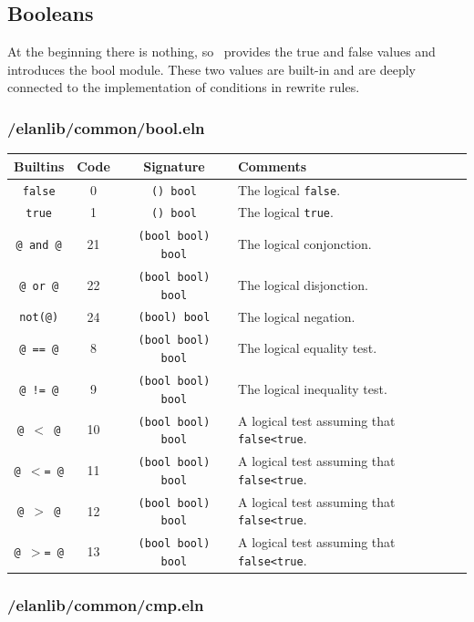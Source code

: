 \subsection{Booleans}

At the beginning there is nothing, so \elan\ provides the true and
false values and introduces the bool module. These two values are
built-in and are deeply connected to the implementation of conditions
in rewrite rules. 

\subsubsection{/elanlib/common/bool.eln}


\begin{tabular}{|c|c|c|p{8cm}|}
\hline
{\bf Builtins} & {\bf Code} & {\bf Signature} & {\bf Comments} \\
\hline
\hline
{\tt false}     & 0 & {\tt () bool} & The logical {\tt false}.\\
{\tt true}      & 1 & {\tt () bool} & The logical {\tt true}.\\
{\tt @ and @}   & 21 & {\tt (bool bool) bool} & The logical conjonction.\\
{\tt @ or @}    & 22 & {\tt (bool bool) bool} & The logical disjonction.\\
{\tt not(@)}    & 24 & {\tt (bool) bool} & The logical negation.\\
{\tt @ == @}    & 8 & {\tt (bool bool) bool} & The logical equality test.\\
{\tt @ != @}    & 9 & {\tt (bool bool) bool} & The logical inequality test.\\
{\tt @ $<$ @}   & 10 & {\tt (bool bool) bool} & A logical test assuming that {\tt false<true}.\\
{\tt @ $<$= @}  & 11 & {\tt (bool bool) bool} & A logical test assuming that {\tt false<true}.\\
{\tt @ $>$ @}   & 12 & {\tt (bool bool) bool} & A logical test assuming that {\tt false<true}.\\
{\tt @ $>$= @}  & 13 & {\tt (bool bool) bool} & A logical test assuming that {\tt false<true}.\\
\hline
\end{tabular}


\subsubsection{/elanlib/common/cmp.eln}

